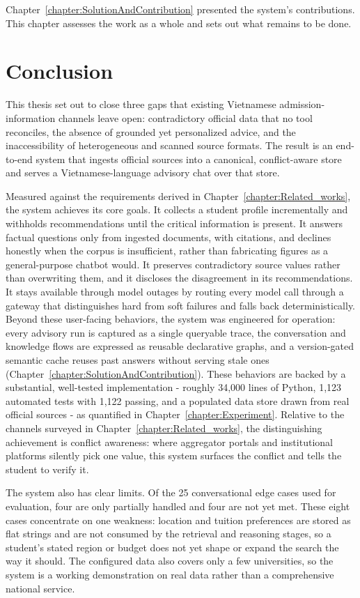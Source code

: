 \documentclass[../main.tex]{subfiles}
\begin{document}
Chapter~\ref{chapter:SolutionAndContribution} presented the system's contributions.
This chapter assesses the work as a whole and sets out what remains to be done.

\section{Conclusion}

This thesis set out to close three gaps that existing Vietnamese admission-information channels leave open: contradictory official data that no tool reconciles, the absence of grounded yet personalized advice, and the inaccessibility of heterogeneous and scanned source formats.
The result is an end-to-end system that ingests official sources into a canonical, conflict-aware store and serves a Vietnamese-language advisory chat over that store.

Measured against the requirements derived in Chapter~\ref{chapter:Related_works}, the system achieves its core goals.
It collects a student profile incrementally and withholds recommendations until the critical information is present.
It answers factual questions only from ingested documents, with citations, and declines honestly when the corpus is insufficient, rather than fabricating figures as a general-purpose chatbot would.
It preserves contradictory source values rather than overwriting them, and it discloses the disagreement in its recommendations.
It stays available through model outages by routing every model call through a gateway that distinguishes hard from soft failures and falls back deterministically.
Beyond these user-facing behaviors, the system was engineered for operation: every advisory run is captured as a single queryable trace, the conversation and knowledge flows are expressed as reusable declarative graphs, and a version-gated semantic cache reuses past answers without serving stale ones (Chapter~\ref{chapter:SolutionAndContribution}).
These behaviors are backed by a substantial, well-tested implementation - roughly 34{,}000 lines of Python, 1{,}123 automated tests with 1{,}122 passing, and a populated data store drawn from real official sources - as quantified in Chapter~\ref{chapter:Experiment}.
Relative to the channels surveyed in Chapter~\ref{chapter:Related_works}, the distinguishing achievement is conflict awareness: where aggregator portals and institutional platforms silently pick one value, this system surfaces the conflict and tells the student to verify it.

The system also has clear limits.
Of the 25 conversational edge cases used for evaluation, four are only partially handled and four are not yet met.
These eight cases concentrate on one weakness: location and tuition preferences are stored as flat strings and are not consumed by the retrieval and reasoning stages, so a student's stated region or budget does not yet shape or expand the search the way it should.
The configured data also covers only a few universities, so the system is a working demonstration on real data rather than a comprehensive national service.
\end{document}
